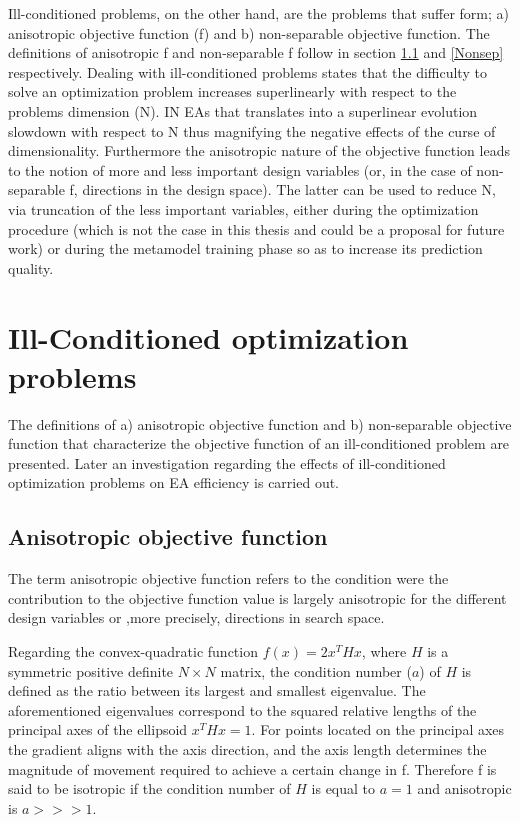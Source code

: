 Ill-conditioned problems, on the other hand, are the problems that suffer form; a) anisotropic objective function (f) and b) non-separable objective function. The definitions of anisotropic f and non-separable f follow in section \ref{IllCon} and \ref{Nonsep} respectively. Dealing with ill-conditioned problems states that the difficulty to solve an optimization problem increases superlinearly with respect to the problems dimension (N).  IN EAs that translates into a superlinear evolution slowdown with respect to N thus magnifying the negative effects of the curse of dimensionality. Furthermore the anisotropic nature of the objective function leads to the notion of more and less important design variables (or, in the case of non-separable f, directions in the design space). The latter can be used to reduce N, via truncation of the less important variables, either during the optimization procedure (which is not the case in this thesis and could be a proposal for future work) or during the metamodel training phase so as to increase its prediction quality.       

\section{Ill-Conditioned optimization problems}
The definitions of a) anisotropic objective function and b) non-separable objective function that characterize the objective function of an ill-conditioned problem are presented. Later an investigation regarding the effects of ill-conditioned optimization problems on EA efficiency is carried out.  

\subsection{Anisotropic objective function}
\label{IllCon}
The term anisotropic objective function refers to the condition were the contribution to the objective function value is largely anisotropic for the different design variables or ,more precisely, directions in search space.

Regarding the convex-quadratic function $f (x) = 2x^THx$, where $H$ is a symmetric positive definite $N \times N$ matrix, the condition number ($a$) of $H$ is defined as the ratio between its largest and smallest eigenvalue. The aforementioned eigenvalues correspond to the squared relative lengths of the principal axes of the ellipsoid $x^THx = 1$. For points located on the principal axes the gradient aligns with the axis direction, and the axis length determines the magnitude of movement required to achieve a certain change in f. Therefore f is said to be isotropic if the condition number of $H$ is equal to $a=1$ and anisotropic is $a>>>1$.

